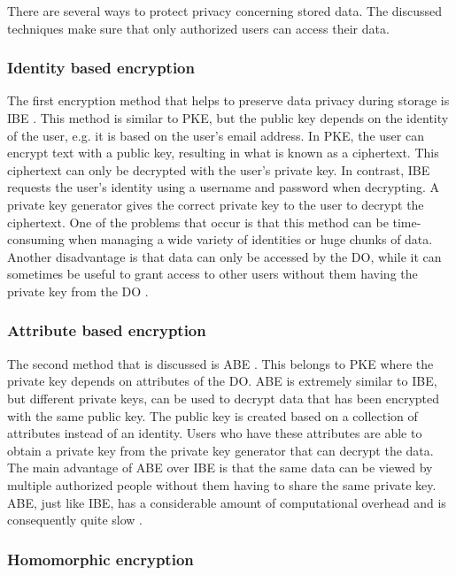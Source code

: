 There are several ways to protect privacy concerning stored data.
The discussed techniques make sure that only authorized users can access their data.

\subsubsection{Identity based encryption}

The first encryption method that helps to preserve data privacy during storage is \gls{IBE} \cite{Kats2019}.
This method is similar to \gls{PKE}, but the public key depends on the identity of the user, e.g. it is based on the user's email address.
In \gls{PKE}, the user can encrypt text with a public key, resulting in what is known as a ciphertext.
This ciphertext can only be decrypted with the user's private key.
In contrast, \gls{IBE} requests the user's identity using a username and password when decrypting.
A private key generator gives the correct private key to the user to decrypt the ciphertext.
One of the problems that occur is that this method can be time-consuming when managing a wide variety of identities or huge chunks of data. 
Another disadvantage is that data can only be accessed by the \gls{DO},
while it can sometimes be useful to grant access to other users without them having the private key from the \gls{DO} \cite{Mehmood2016, Kats2019}.  

\subsubsection{Attribute based encryption}

The second method that is discussed is \gls{ABE} \cite{Jain2016, Mehmood2016}.
This belongs to \gls{PKE} where the private key depends on attributes of the \gls{DO}.
\gls{ABE} is extremely similar to \gls{IBE}, but different private keys, can be used to decrypt data that has been encrypted with the same public key.
The public key is created based on a collection of attributes instead of an identity.
Users who have these attributes are able to obtain a private key from the private key generator that can decrypt the data.
The main advantage of \gls{ABE} over \gls{IBE} is that the same data can be viewed by multiple authorized people without them having to share the same private key. 
\gls{ABE}, just like \gls{IBE}, has a considerable amount of computational overhead and is consequently quite slow \cite{Jain2016, Mehmood2016}. 

\subsubsection{Homomorphic encryption}
\label{s:HomomorphicEncryption}

